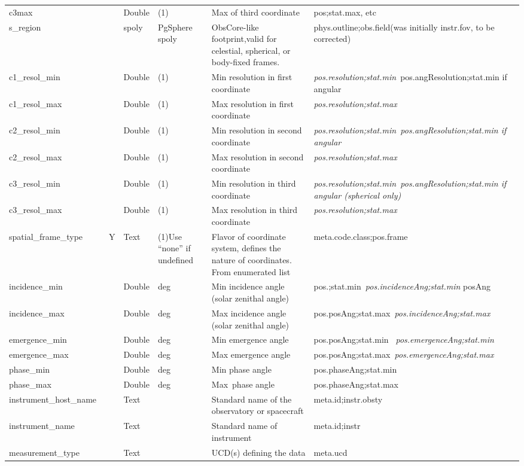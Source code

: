 \documentclass[11pt,a4paper]{ivoa}
\begin{document}
\begin{longtable}{p{3.5cm}p{0.5cm}p{1cm}p{1cm}p{7cm}p{3cm}}
c3max& &Double&(1)&Max of third coordinate&pos;stat.max, etc\\
s\_region& &spoly&PgSphere spoly&ObsCore-like footprint,valid for celestial, spherical, or body-fixed frames.&phys.outline;obs.field(was initially instr.fov, to be corrected)\\
c1\_resol\_min& &Double&(1)&Min resolution in first coordinate&\emph{pos.resolution;stat.min} pos.angResolution;stat.min if angular\\
c1\_resol\_max& &Double&(1)&Max resolution in first coordinate&\emph{pos.resolution;stat.max}\\
c2\_resol\_min& &Double&(1)&Min resolution in second coordinate&\emph{pos.resolution;stat.min pos.angResolution;stat.min if angular}\\
c2\_resol\_max& &Double&(1)&Max resolution in second coordinate&\emph{pos.resolution;stat.max}\\
c3\_resol\_min& &Double&(1)&Min resolution in third coordinate&\emph{pos.resolution;stat.min pos.angResolution;stat.min if angular (spherical only)}\\
c3\_resol\_max& &Double&(1)&Max resolution in third coordinate&\emph{pos.resolution;stat.max}\\
spatial\_frame\_type& Y&Text&(1)Use ``none'' if undefined&Flavor of coordinate system, defines the nature of coordinates. From enumerated list&meta.code.class;pos.frame\\
incidence\_min& &Double&deg&Min incidence angle (solar zenithal angle)&pos.;stat.min\emph{ }\emph{pos.incidenceAng;stat.min }posAng\\
incidence\_max& &Double&deg&Max incidence angle (solar zenithal angle)&pos.posAng;stat.max \emph{pos.incidenceAng;stat.max }\\
emergence\_min& &Double&deg&Min emergence angle&pos.posAng;stat.min \emph{ }\emph{pos.emergenceAng;stat.min }\\
emergence\_max& &Double&deg&Max emergence angle&pos.posAng;stat.max\emph{ pos.emergenceAng;stat.max}\\
phase\_min& &Double&deg&Min phase angle&pos.phaseAng;stat.min\\
phase\_max& &Double&deg&Max phase angle&pos.phaseAng;stat.max\\
instrument\_host\_name& &Text& &Standard name of the observatory or spacecraft&meta.id;instr.obsty\\
instrument\_name& &Text& &Standard name of instrument&meta.id;instr\\
measurement\_type& &Text& &UCD(s) defining the data&meta.ucd\\

\end{longtable}
\end{document}
